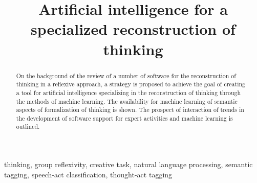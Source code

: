 \documentclass[conference]{IEEEtran}
\begin{document}
	
	\title{Artificial intelligence for a specialized reconstruction of thinking}
	
	
	\author{
		\and
		\and
		\and
	}
	
	\maketitle
	
	\begin{abstract}
		On the background of the review of a number of software for the reconstruction of thinking in a reflexive approach, a strategy is proposed to achieve the goal of creating a tool for artificial intelligence specializing in the reconstruction of thinking through the methods of machine learning.
		The availability for machine learning of semantic aspects of formalization of thinking is shown. The prospect of interaction of trends in the development of software support for expert activities and machine learning is outlined.
	\end{abstract}
	
	\begin{IEEEkeywords}
		thinking,
		group reflexivity,
		creative task,
		natural language processing,
		semantic tagging,
		speech-act classification,
		thought-act tagging
	\end{IEEEkeywords}
	
\end{document}
